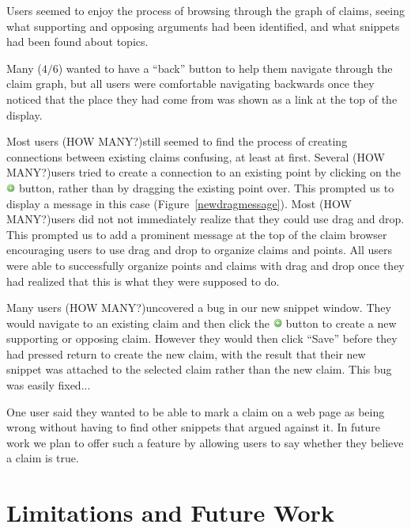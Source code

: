 \documentclass{chi2009}
\newcommand{\todo}[1]{}
\newcommand{\howmany}{{\color{red} (HOW MANY?)}}
\begin{document}
Users seemed to enjoy the process of browsing through the graph of claims, seeing what supporting and opposing arguments had been identified, and what snippets had been found about topics.

Many ($4/6$) wanted to have a ``back'' button to help them navigate through the claim graph, but all users were comfortable navigating backwards once they noticed that the place they had come from was shown as a link at the top of the display.

Most users \howmany still seemed to find the process of creating connections between existing claims confusing, at least at first. Several \howmany users tried to create a connection to an existing point by clicking on the \includegraphics[width=0.3cm]{../images/add.png} button, rather than by dragging the existing point over. This prompted us to display a message in this case (Figure~\ref{newdragmessage}). Most \howmany users did not not immediately realize that they could use drag and drop. This prompted us to add a prominent message at the top of the claim browser encouraging users to use drag and drop to organize claims and points. All users were able to successfully organize points and claims with drag and drop once they had realized that this is what they were supposed to do.

Many users \howmany uncovered a bug in our new snippet window. They would navigate to an existing claim and then click the \includegraphics[width=0.3cm]{../images/add.png} button to create a new supporting or opposing claim. However they would then click ``Save'' before they had pressed return to create the new claim, with the result that their new snippet was attached to the selected claim rather than the new claim. This bug was easily fixed...

One user said they wanted to be able to mark a claim on a web page as being wrong without having to find other snippets that argued against it. In future work we plan to offer such a feature by allowing users to say whether they believe a claim is true.

\todo{quote collection}


\section{Limitations and Future Work}
\end{document}
